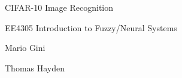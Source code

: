     \begin{titlepage}

    \begin{center}
    \vspace*{6cm}
    \centering
    \Huge
    { CIFAR-10 Image Recognition }
    \vspace{2cm}

    \Huge
    {EE4305 Introduction to Fuzzy/Neural Systems}
    \vspace{0.5cm}
    
    \Large
    {Mario Gini

    Thomas Hayden}
    \vfill
    \vspace{0.8cm}
    \end{center}
    \end{titlepage}